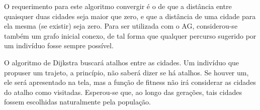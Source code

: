 O requerimento para este algoritmo convergir é o de que a distância entre quaisquer duas cidades seja maior que zero, e que a distância de uma cidade para ela mesma (se existir) seja zero. Para ser utilizada com o AG, considerou-se também um grafo inicial conexo, de tal forma que qualquer percurso sugerido por um indivíduo fosse sempre possível.

O algoritmo de Dijkstra buscará atalhos entre as cidades. Um indivíduo que propuser um trajeto, a princípio, não saberá dizer se há atalhos. Se houver um, ele será apresentado na tela, mas a função de fitness não irá considerar as cidades do atalho como visitadas. Esperou-se que, ao longo das gerações, tais cidades fossem escolhidas naturalmente pela população.

